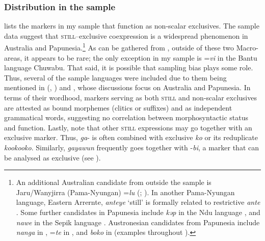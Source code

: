 \subsubsection{Distribution in the sample}
 lists the markers in my sample that function as non-scalar exclusives. The sample data suggest that \textsc{still}–exclusive coexpression is a widespread phenomenon in Australia and Papunesia.\footnote{An additional Australian candidate from outside the sample is Jaru/Wanyjirra (Pama-Nyungan) \mbox{=\textit{lu}} (\cite[506–512]{Senge2015}; \cite[210]{Tsunoda1981}). In another Pama-Nyungan language, Eastern Arrernte, \textit{anteye} \lq still' is formally related to restrictive \textit{ante} \parencite[350–351]{Wilkins1989}. Some further candidates in Papunesia include \textit{kəp} in the Ndu language  \parencite[100, 567]{Aikhenvald2008}, and \textit{nawe} in the Sepik language  \parencite[479]{Hatfield2016}. Austronesian candidates from Papunesia include  \textit{nanga} in  \parencite[201–202]{Volker1994}, \mbox{=\textit{te}} in  \parencite[301–302]{Rehg1981}, and \textit{boko} in  (examples throughout \cite{Mosel1984}).}   As can be gathered from , outside of these two Macro-areas, it appears to be rare; the only exception in my sample is \mbox{=\textit{vi}} in the Bantu language Chuwabu.  That said, it is possible that sampling bias plays some role. Thus, several of the sample languages were included due to them being mentioned in \citeauthor{vanBaar1991} (\citeyear{vanBaar1991}, \citeyear{vanBaar1997}) and \textcite{SchultzeBerndt2002}, whose discussions focus on Australia and Papunesia. In terms of their wordhood, markers serving as both \textsc{still} and non-scalar exclusives are attested as bound morphemes (clitics or suffixes) and as independent grammatical words, suggesting no correlation between morphosyntactic status and function. Lastly, note that other \textsc{still} expressions may go together with an exclusive marker. Thus,  \mbox{\textit{ga}-} is often combined with exclusive \textit{ko} or its reduplicate \textit{kookooko}. Similarly,  \textit{gayawun} frequently goes together with \mbox{-\textit{bi}}, a marker that can be analysed as exclusive (see \cite{SchultzeBerndt2002}).

